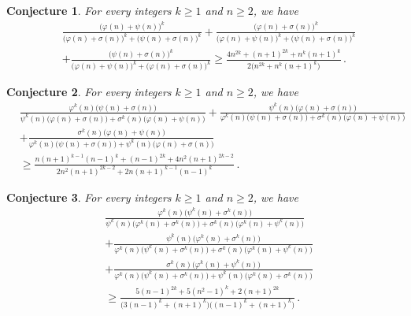 \documentclass[12pt]{article}
\newtheorem{conjecture}{Conjecture}
\begin{document}
\begin{conjecture}\label{Conjecture7}
For every integers $k\geq1$ and $n\geq2$, we have
\begin{align*}
&\frac{\big(\varphi(n)+\psi(n)\big)^k}{\big(\varphi(n)+\sigma(n)\big)^k+\big(\psi(n)+\sigma(n)\big)^k}+\frac{\big(\varphi(n)+\sigma(n)\big)^k}{\big(\varphi(n)+\psi(n)\big)^k+\big(\psi(n)+\sigma(n)\big)^k}\\
&+\frac{\big(\psi(n)+\sigma(n)\big)^k}{\big(\varphi(n)+\psi(n)\big)^k+\big(\varphi(n)+\sigma(n)\big)^k}\geq\frac{4n^{2k}+(n+1)^{2k}+n^k(n+1)^k}{2\big(n^{2k}+n^k(n+1)^k\big)}\,. 
\end{align*}
\end{conjecture}


\begin{conjecture}\label{Conjecture8}
For every integers $k\geq1$ and $n\geq2$, we have
\begin{align*}
&\frac{\varphi^k(n)\big(\psi(n)+\sigma(n)\big)}{\psi^k(n)\big(\varphi(n)+\sigma(n)\big)+\sigma^k(n)\big(\varphi(n)+\psi(n)\big)}
+\frac{\psi^k(n)\big(\varphi(n)+\sigma(n)\big)}{\varphi^k(n)\big(\psi(n)+\sigma(n)\big)+\sigma^k(n)\big(\varphi(n)+\psi(n)\big)}\\
&+\frac{\sigma^k(n)\big(\varphi(n)+\psi(n)\big)}{\varphi^k(n)\big(\psi(n)+\sigma(n)\big)+\psi^k(n)\big(\varphi(n)+\sigma(n)\big)}\\
&\geq\frac{n(n+1)^{k-1}(n-1)^k+(n-1)^{2k}+4n^2(n+1)^{2k-2}}{2n^2(n+1)^{2k-2}+2n(n+1)^{k-1}(n-1)^k}\,.
\end{align*}
\end{conjecture}


\begin{conjecture}\label{Conjecture9}
For every integers $k\geq1$ and $n\geq2$, we have
\begin{align*}
&\frac{\varphi^k(n)\big(\psi^k(n)+\sigma^k(n)\big)}{\psi^k(n)\big(\varphi^k(n)+\sigma^k(n)\big)+\sigma^k(n)\big(\varphi^k(n)+\psi^k(n)\big)}\\
&+\frac{\psi^k(n)\big(\varphi^k(n)+\sigma^k(n)\big)}{\varphi^k(n)\big(\psi^k(n)+\sigma^k(n)\big)+\sigma^k(n)\big(\varphi^k(n)+\psi^k(n)\big)}\\
&+\frac{\sigma^k(n)\big(\varphi^k(n)+\psi^k(n)\big)}{\varphi^k(n)\big(\psi^k(n)+\sigma^k(n)\big)+\psi^k(n)\big(\varphi^k(n)+\sigma^k(n)\big)}\\
&\geq\frac{5(n-1)^{2k}+5(n^2-1)^k+2(n+1)^{2k}}{\big(3(n-1)^k+(n+1)^k\big)\big((n-1)^k+(n+1)^k\big)}\,. 
\end{align*}
\end{conjecture}
\end{document}
